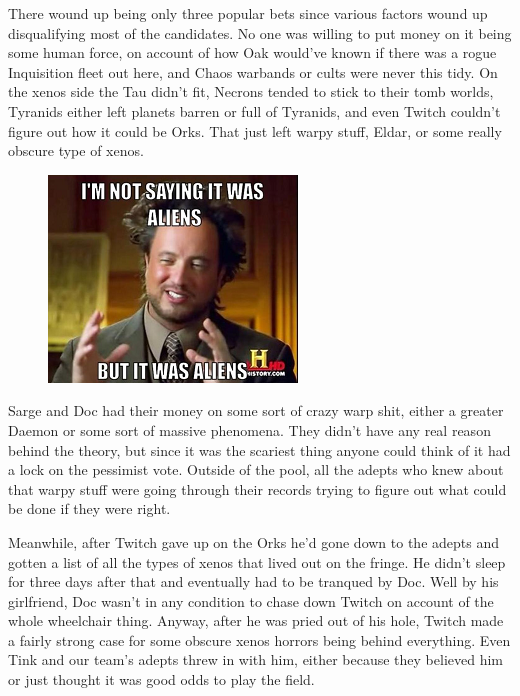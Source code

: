 There wound up being only three popular bets since various factors wound up disqualifying most of the candidates. 
No one was willing to put money on it being some human force, on account of how Oak would've known if there was a rogue Inquisition fleet out here, and Chaos warbands or cults were never this tidy. 
On the xenos side the Tau didn't fit, Necrons tended to stick to their tomb worlds, Tyranids either left planets barren or full of Tyranids, and even Twitch couldn't figure out how it could be Orks. 
That just left warpy stuff, Eldar, or some really obscure type of xenos.

\begin{figure}
	\begin{center}
		\includegraphics[width=\figwidth]{pics/11/10.png}
	\end{center}
\end{figure}
Sarge and Doc had their money on some sort of crazy warp shit, either a greater Daemon or some sort of massive phenomena. 
They didn't have any real reason behind the theory, but since it was the scariest thing anyone could think of it had a lock on the pessimist vote. 
Outside of the pool, all the adepts who knew about that warpy stuff were going through their records trying to figure out what could be done if they were right.

Meanwhile, after Twitch gave up on the Orks he'd gone down to the adepts and gotten a list of all the types of xenos that lived out on the fringe. 
He didn't sleep for three days after that and eventually had to be tranqued by Doc. 
Well by his girlfriend, Doc wasn't in any condition to chase down Twitch on account of the whole wheelchair thing. 
Anyway, after he was pried out of his hole, Twitch made a fairly strong case for some obscure xenos horrors being behind everything. 
Even Tink and our team's adepts threw in with him, either because they believed him or just thought it was good odds to play the field.

